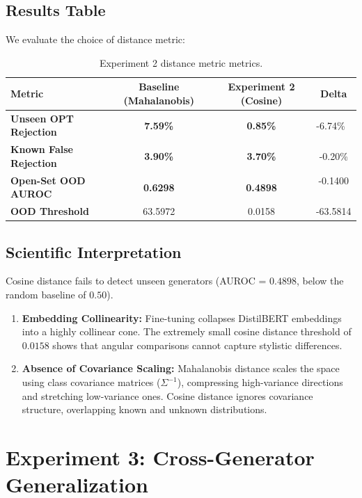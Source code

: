 \documentclass[12pt,a4paper]{report}
\begin{document}
\section{Results Table}
We evaluate the choice of distance metric:
\begin{table}[h]
\centering
\begin{tabular}{lccc}
\toprule
\textbf{Metric} & \textbf{Baseline (Mahalanobis)} & \textbf{Experiment 2 (Cosine)} & \textbf{Delta} \\
\midrule
\textbf{Unseen OPT Rejection} & \textbf{7.59\%} & \textbf{0.85\%} & -6.74\% 🛑 \\
\textbf{Known False Rejection} & \textbf{3.90\%} & \textbf{3.70\%} & -0.20\% \\
\textbf{Open-Set OOD AUROC} & \textbf{0.6298} & \textbf{0.4898} & -0.1400 🛑 \\
\textbf{OOD Threshold} & 63.5972 & 0.0158 & -63.5814 \\
\bottomrule
\end{tabular}
\caption{Experiment 2 distance metric metrics.}
\label{tab:exp2_results}
\end{table}

\section{Scientific Interpretation}
Cosine distance fails to detect unseen generators (AUROC = $0.4898$, below the random baseline of $0.50$).
\begin{enumerate}
    \item \textbf{Embedding Collinearity:} Fine-tuning collapses DistilBERT embeddings into a highly collinear cone. The extremely small cosine distance threshold of $0.0158$ shows that angular comparisons cannot capture stylistic differences.
    \item \textbf{Absence of Covariance Scaling:} Mahalanobis distance scales the space using class covariance matrices ($\Sigma^{-1}$), compressing high-variance directions and stretching low-variance ones. Cosine distance ignores covariance structure, overlapping known and unknown distributions.
\end{enumerate}

\chapter{Experiment 3: Cross-Generator Generalization}
\label{ch:exp3}
\end{document}
